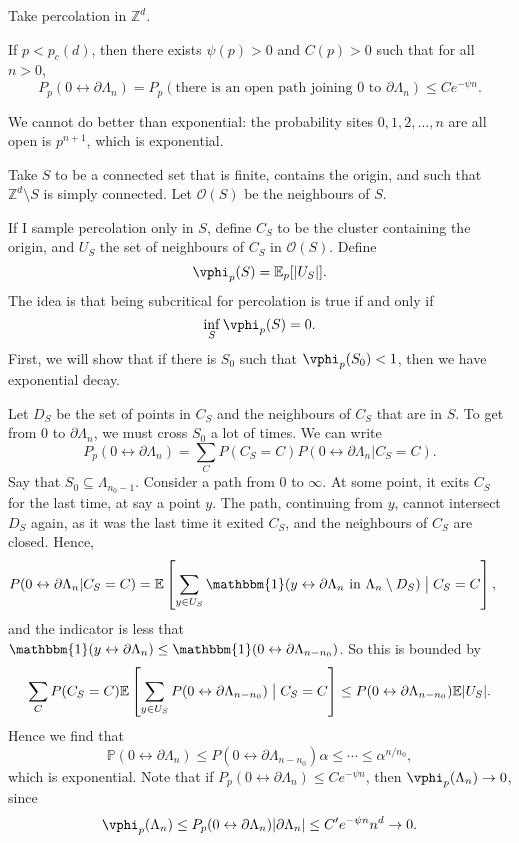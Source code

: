 \documentclass[12pt]{article}
\begin{document}
Take percolation in $\mathbb{Z}^{d}$.

\begin{theorem}
	If $p < p_c(d)$, then there exists $\psi(p) > 0$ and $C(p) > 0$ such that for all $n > 0$,
	\[
		P_p(0 \leftrightarrow \partial \Lambda_n) = P_p(\text{there is an open path joining $0$ to $\partial \Lambda_n$}) \leq C e^{-\psi n}.
	\]
\end{theorem}

\begin{remark}
	We cannot do better than exponential: the probability sites $0, 1, 2, \ldots, n$ are all open is $p^{n+1}$, which is exponential.
\end{remark}

\begin{proofbox}
	Take $S$ to be a connected set that is finite, contains the origin, and such that $\mathbb{Z}^{d} \setminus S$ is simply connected. Let $\mathcal{O}(S)$ be the neighbours of $S$.

	If I sample percolation only in $S$, define $C_S$ to be the cluster containing the origin, and $U_S$ the set of neighbours of $C_S$ in $\mathcal{O}(S)$. Define
	\[
	\vphi_p(S) = \mathbb{E}_p[|U_S|].
	\]
	The idea is that being subcritical for percolation is true if and only if
	\[
	\inf_S \vphi_p(S) = 0.
	\]
	First, we will show that if there is $S_0$ such that $\vphi_p(S_0) < 1$, then we have exponential decay.


	Let $D_S$ be the set of points in $C_S$ and the neighbours of $C_S$ that are in $S$. To get from $0$ to $\partial \Lambda_n$, we must cross $S_0$ a lot of times. We can write
	\[
	P_p(0 \leftrightarrow \partial \Lambda_n) = \sum_C P(C_S = C) P(0 \leftrightarrow \partial \Lambda_n | C_S = C).
	\]
	Say that $S_0 \subseteq \Lambda_{n_0 - 1}$. Consider a path from $0$ to $\infty$. At some point, it exits $C_S$ for the last time, at say a point $y$. The path, continuing from $y$, cannot intersect $D_S$ again, as it was the last time it exited $C_S$, and the neighbours of $C_S$ are closed. Hence,
	\begin{align*}
		P(0 \leftrightarrow \partial \Lambda_n | C_S = C) &= \mathbb{E}\left[\sum_{y \in U_S} \mathbbm{1}(y \leftrightarrow \partial \Lambda_n \text{ in } \Lambda_n \setminus D_S) \bigm| C_S = C\right],
	\end{align*}
	and the indicator is less that $\mathbbm{1}(y \leftrightarrow \partial \Lambda_n) \leq \mathbbm{1}(0 \leftrightarrow \partial \Lambda_{n - n_0})$. So this is bounded by
	\[
	\sum_C P(C_S = C) \mathbb{E}\left[ \sum_{y \in U_S} P(0 \leftrightarrow \partial \Lambda_{n - n_0}) \bigm| C_S = C \right] \leq P(0 \leftrightarrow \partial \Lambda_{n - n_0}) \mathbb{E} |U_S|.
	\]
	Hence we find that
	\[
	\mathbb{P}(0 \leftrightarrow \partial \Lambda_n) \leq P(0 \leftrightarrow \partial \Lambda_{n - n_0}) \alpha \leq \cdots \leq \alpha^{n / n_0},
	\]
	which is exponential.
	Note that if $P_p(0 \leftrightarrow \partial \Lambda_n) \leq C e^{-\psi n}$, then $\vphi_p(\Lambda_n) \to 0$, since
	\[
	\vphi_p(\Lambda_n) \leq P_p(0 \leftrightarrow \partial \Lambda_n) |\partial \Lambda_n| \leq C' e^{-\psi n} n^{d} \to 0.
	\]
\end{proofbox}
\end{document}
